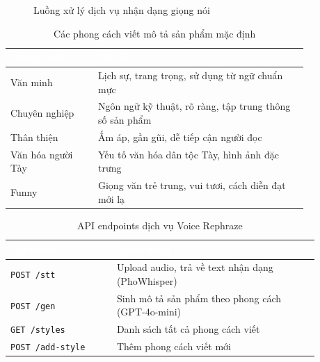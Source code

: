 {\begin{figure}[htbp]
\centering
{}
\caption{Luồng xử lý dịch vụ nhận dạng giọng nói}
\label{fig:voice-rephraze-flow}
\end{figure}

\begin{table}[htbp]
\centering
\caption{Các phong cách viết mô tả sản phẩm mặc định}
\label{tab:writing-styles}
\begin{tabular}{>{\raggedright\arraybackslash}p{0.25\linewidth} >{\raggedright\arraybackslash}p{0.6\linewidth}}
\toprule
\rowcolor{headerblue} \textcolor{white}{\textbf{Phong cách}} & \textcolor{white}{\textbf{Mô tả}} \\
\midrule
\rowcolor{rowgray} Văn minh & Lịch sự, trang trọng, sử dụng từ ngữ chuẩn mực \\
Chuyên nghiệp & Ngôn ngữ kỹ thuật, rõ ràng, tập trung thông số sản phẩm \\
\rowcolor{rowgray} Thân thiện & Ấm áp, gần gũi, dễ tiếp cận người đọc \\
Văn hóa người Tày & Yếu tố văn hóa dân tộc Tày, hình ảnh đặc trưng \\
\rowcolor{rowgray} Funny & Giọng văn trẻ trung, vui tươi, cách diễn đạt mới lạ \\
\bottomrule
\end{tabular}
\end{table}

\begin{table}[htbp]
\centering
\caption{API endpoints dịch vụ Voice Rephraze}
\label{tab:voice-api}
\begin{tabular}{>{\raggedright\arraybackslash}p{0.3\linewidth} >{\raggedright\arraybackslash}p{0.58\linewidth}}
\toprule
\rowcolor{headerblue} \textcolor{white}{\textbf{Endpoint}} & \textcolor{white}{\textbf{Chức năng}} \\
\midrule
\rowcolor{rowgray} \texttt{POST /stt} & Upload audio, trả về text nhận dạng (PhoWhisper) \\
\texttt{POST /gen} & Sinh mô tả sản phẩm theo phong cách (GPT-4o-mini) \\
\rowcolor{rowgray} \texttt{GET /styles} & Danh sách tất cả phong cách viết \\
\texttt{POST /add-style} & Thêm phong cách viết mới \\
\bottomrule
\end{tabular}
\end{table}

}%

